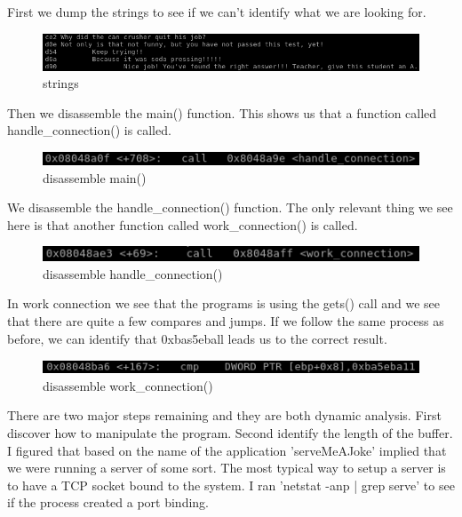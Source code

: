 \documentclass[10pt]{article}
\begin{document}
First we dump the strings to see if we can't identify what we are looking for.

\begin{figure}[H]
\centering
\includegraphics[scale=0.5]{./images/ss18.png}
\caption{strings}
\label{fig:Code}
\end{figure}

Then we disassemble the main() function.  This shows us that a function called handle\_connection() is called.

\begin{figure}[H]
\centering
\includegraphics[scale=0.5]{./images/ss15.png}
\caption{disassemble main()}
\label{fig:Code}
\end{figure}

We disassemble the handle\_connection() function.  The only relevant thing we see here is that another function called work\_connection() is called.

\begin{figure}[H]
\centering
\includegraphics[scale=0.5]{./images/ss16.png}
\caption{disassemble handle\_connection()}
\label{fig:Code}
\end{figure}

In work connection we see that the programs is using the gets() call and we see that there are quite a few compares and jumps.  If we follow the same process as before, we can identify that 0xbas5eball leads us to the correct result.

\begin{figure}[H]
\centering
\includegraphics[scale=0.5]{./images/ss17.png}
\caption{disassemble work\_connection()}
\label{fig:Code}
\end{figure}

There are two major steps remaining and they are both dynamic analysis.  First discover how to manipulate the program.  Second identify the length of the buffer.  I figured that based on the name of the application 'serveMeAJoke' implied that we were running a server of some sort.  The most typical way to setup a server is to have a TCP socket bound to the system.  I ran 'netstat -anp | grep serve' to see if the process created a port binding.
\end{document}
